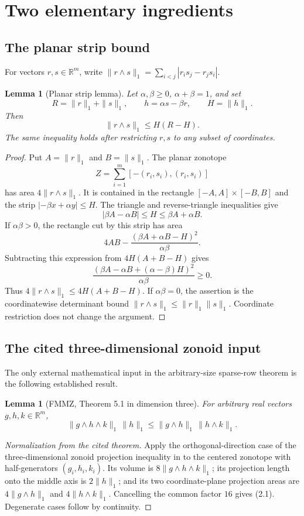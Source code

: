 \documentclass[11pt]{article}
\newtheorem{lemma}[theorem]{Lemma}
\newcommand{\R}{\mathbb R}
\begin{document}
\section{Two elementary ingredients}
\subsection{The planar strip bound}
For vectors $r,s\in\R^m$, write $\|r\wedge s\|_1=\sum_{i<j}|r_i s_j-r_j s_i|$.

\begin{lemma}[Planar strip lemma]\label{lem:strip}
Let $\alpha,\beta\geq0$, $\alpha+\beta=1$, and set
\[
 R=\|r\|_1+\|s\|_1,\qquad h=\alpha s-\beta r,\qquad H=\|h\|_1.
\]
Then
\[
                         \|r\wedge s\|_1\leq H(R-H).
\]
The same inequality holds after restricting $r,s$ to any subset of coordinates.
\end{lemma}
\begin{proof}
Put $A=\|r\|_1$ and $B=\|s\|_1$. The planar zonotope
\[
 Z=\sum_{i=1}^m[-(r_i,s_i),(r_i,s_i)]
\]
has area $4\|r\wedge s\|_1$. It is contained in the rectangle $[-A,A]\times[-B,B]$ and the strip $|{-\beta x+\alpha y}|\leq H$. The triangle and reverse-triangle inequalities give
\[
 |\beta A-\alpha B|\leq H\leq\beta A+\alpha B.
\]
If $\alpha\beta>0$, the rectangle cut by this strip has area
\[
 4AB-\frac{(\beta A+\alpha B-H)^2}{\alpha\beta}.
\]
Subtracting this expression from $4H(A+B-H)$ gives
\[
 \frac{(\beta A-\alpha B+(\alpha-\beta)H)^2}{\alpha\beta}\geq0.
\]
Thus $4\|r\wedge s\|_1\leq4H(A+B-H)$. If $\alpha\beta=0$, the assertion is the coordinatewise determinant bound $\|r\wedge s\|_1\leq\|r\|_1\|s\|_1$. Coordinate restriction does not change the argument.
\end{proof}

\subsection{The cited three-dimensional zonoid input}
The only external mathematical input in the arbitrary-size sparse-row theorem is the following established result.

\begin{lemma}[FMMZ, Theorem 5.1 in dimension three]\label{lem:fmmz}
For arbitrary real vectors $g,h,k\in\R^m$,
\[
 \|g\wedge h\wedge k\|_1\,\|h\|_1
 \leq \|g\wedge h\|_1\,\|h\wedge k\|_1.
 \tag{2.1}
\]
\end{lemma}
\begin{proof}[Normalization from the cited theorem]
Apply the orthogonal-direction case of the three-dimensional zonoid projection inequality in \cite[Theorem~5.1]{FMMZ} to the centered zonotope with half-generators $(g_i,h_i,k_i)$. Its volume is $8\|g\wedge h\wedge k\|_1$; its projection length onto the middle axis is $2\|h\|_1$; and its two coordinate-plane projection areas are $4\|g\wedge h\|_1$ and $4\|h\wedge k\|_1$. Cancelling the common factor $16$ gives (2.1). Degenerate cases follow by continuity.
\end{proof}
\end{document}
